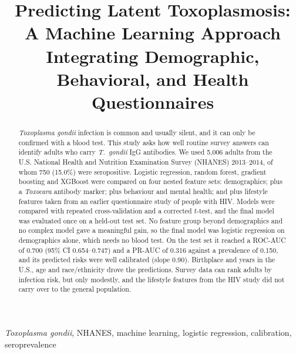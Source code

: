 \documentclass[conference]{IEEEtran}
\begin{document}
\title{Predicting Latent Toxoplasmosis: A Machine Learning Approach Integrating Demographic, Behavioral, and Health Questionnaires}

\author{
\and
{}
}

\maketitle

\begin{abstract}
\textit{Toxoplasma gondii} infection is common and usually silent, and it can only be confirmed with a blood test. This study asks how well routine survey answers can identify adults who carry \textit{T.~gondii} IgG antibodies. We used 5,006 adults from the U.S. National Health and Nutrition Examination Survey (NHANES) 2013--2014, of whom 750 (15.0\%) were seropositive. Logistic regression, random forest, gradient boosting and XGBoost were compared on four nested feature sets: demographics; plus a \textit{Toxocara} antibody marker; plus behaviour and mental health; and plus lifestyle features taken from an earlier questionnaire study of people with HIV. Models were compared with repeated cross-validation and a corrected $t$-test, and the final model was evaluated once on a held-out test set. No feature group beyond demographics and no complex model gave a meaningful gain, so the final model was logistic regression on demographics alone, which needs no blood test. On the test set it reached a ROC-AUC of 0.700 (95\% CI 0.654--0.747) and a PR-AUC of 0.316 against a prevalence of 0.150, and its predicted risks were well calibrated (slope 0.90). Birthplace and years in the U.S., age and race/ethnicity drove the predictions. Survey data can rank adults by infection risk, but only modestly, and the lifestyle features from the HIV study did not carry over to the general population.
\end{abstract}

\begin{IEEEkeywords}
\textit{Toxoplasma gondii}, NHANES, machine learning, logistic regression, calibration, seroprevalence
\end{IEEEkeywords}
\end{document}
